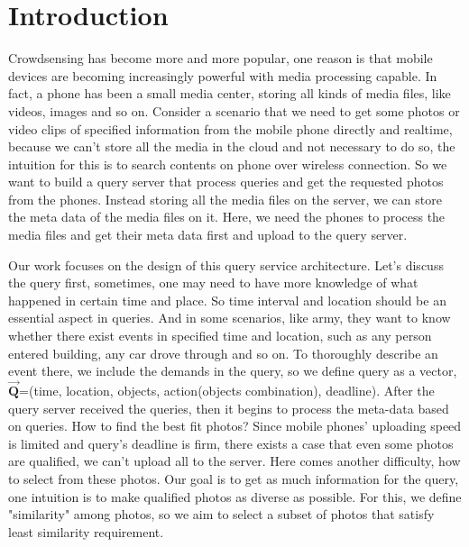 \section{Introduction}
\label{sec:intro}

Crowdsensing has become more and more popular, one reason is that mobile devices are becoming increasingly powerful with media processing capable. In fact, a phone has been a small media center, storing all kinds of media files, like videos, images and so on. Consider a scenario that we need to get some photos or video clips of specified information from the mobile phone directly and realtime, because we can't store all the media in the cloud and not necessary to do so, the intuition for this is to search contents on phone over wireless connection. So we want to build a query server that process queries and get the requested photos from the phones. Instead storing all the media files on the server, we can store the meta data of the media files on it. Here, we need the phones to process the media files and get their meta data first and upload to the query server.

Our work focuses on the design of this query service architecture. Let's discuss the query first, sometimes, one may need to have more knowledge of what happened in certain time and place. So time interval and location should be an essential aspect in queries. And in some scenarios, like army, they want to know whether there exist events in specified time and location, such as any person entered building, any car drove through and so on. To thoroughly describe an event there, we include the demands in the query, so we define query as a vector, $\overrightarrow{\mathbf{Q}}$=(time, location, objects, action(objects combination), deadline). After the query server received the queries, then it begins to process the meta-data based on queries. How to find the best fit photos? Since mobile phones' uploading speed is limited and query's deadline is firm, there exists a case that even some photos are qualified, we can't upload all to the server. Here comes another difficulty, how to select from these photos. Our goal is to get as much information for the query, one intuition is to make qualified photos as diverse as possible. For this, we define "similarity" among photos, so we aim to select a subset of photos that satisfy least similarity requirement. 